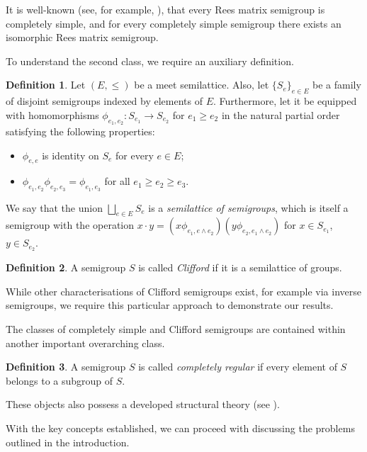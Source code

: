\documentclass{article}
\theoremstyle{definition}
\newtheorem{definition}{Definition}
\begin{document}
It is well-known (see, for example, \cite[Theorem 3.3.1]{How95}), that every Rees matrix semigroup is completely simple, and for every completely simple semigroup there exists an isomorphic Rees matrix semigroup.

To understand the second class, we require an auxiliary definition.

\begin{definition}
Let $(E, \le)$ be a meet semilattice. Also, let $\{S_e\}_{e \in E}$ be a family of disjoint semigroups indexed by elements of $E$. Furthermore, let it be equipped with homomorphisms $\phi_{e_1,e_2}: S_{e_1}\rightarrow S_{e_2}$ for $e_1 \ge e_2$ in the natural partial order satisfying the following properties:

\begin{itemize}
\item $\phi_{e,e}$ is identity on $S_e$ for every $e \in E$;
\item $\phi_{e_1,e_2} \phi_{e_2,e_3} = \phi_{e_1,e_3}$ for all $e_1 \ge e_2 \ge e_3$. 
\end{itemize}

We say that the union $\bigsqcup\limits_{e\in E} S_e$ is a {\em semilattice of semigroups}, which is itself a semigroup with the operation $x \cdot y = (x \phi_{e_1,e \wedge e_2})(y \phi_{e_2,e_1 \wedge e_2})$ for $x \in S_{e_1}$, $y \in S_{e_2}$. 
\end{definition}

\begin{definition}
A semigroup $S$ is called {\em Clifford} if it is a semilattice of groups.
\end{definition}

While other characterisations of Clifford semigroups exist, for example via inverse semigroups, we require this particular approach to demonstrate our results.

The classes of completely simple and Clifford semigroups are contained within another important overarching class.

\begin{definition}
A semigroup $S$ is called {\em completely regular} if every element of $S$ belongs to a subgroup of $S$.
\end{definition}

These objects also possess a developed structural theory (see \cite{Pet}).

With the key concepts established, we can proceed with discussing the problems outlined in the introduction. 
\end{document}
